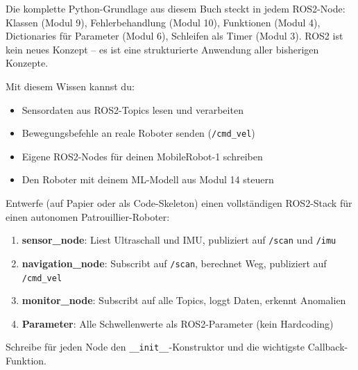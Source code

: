 \begin{merksatz}
Die komplette Python-Grundlage aus diesem Buch steckt in jedem ROS2-Node: Klassen (Modul 9), Fehlerbehandlung (Modul 10), Funktionen (Modul 4), Dictionaries für Parameter (Modul 6), Schleifen als Timer (Modul 3). ROS2 ist kein neues Konzept -- es ist eine strukturierte Anwendung aller bisherigen Konzepte.
\end{merksatz}

\begin{praxis}
Mit diesem Wissen kannst du:
\begin{itemize}
    \item Sensordaten aus ROS2-Topics lesen und verarbeiten
    \item Bewegungsbefehle an reale Roboter senden (\texttt{/cmd\_vel})
    \item Eigene ROS2-Nodes für deinen MobileRobot-1 schreiben
    \item Den Roboter mit deinem ML-Modell aus Modul 14 steuern
\end{itemize}
\end{praxis}

\begin{uebung}[title=Abschlussprojekt: Autonomer Patrouillier-Roboter]
Entwerfe (auf Papier oder als Code-Skeleton) einen vollständigen ROS2-Stack für einen autonomen Patrouillier-Roboter:
\begin{enumerate}
    \item \textbf{sensor\_node}: Liest Ultraschall und IMU, publiziert auf \texttt{/scan} und \texttt{/imu}
    \item \textbf{navigation\_node}: Subscribt auf \texttt{/scan}, berechnet Weg, publiziert auf \texttt{/cmd\_vel}
    \item \textbf{monitor\_node}: Subscribt auf alle Topics, loggt Daten, erkennt Anomalien
    \item \textbf{Parameter}: Alle Schwellenwerte als ROS2-Parameter (kein Hardcoding)
\end{enumerate}
Schreibe für jeden Node den \texttt{\_\_init\_\_}-Konstruktor und die wichtigste Callback-Funktion.
\end{uebung}
